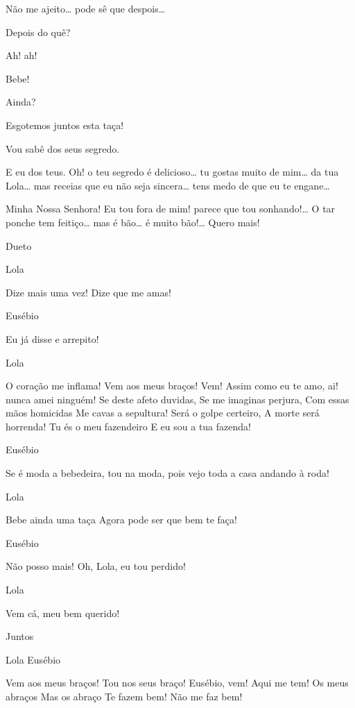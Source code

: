  Não me ajeito\ldots{} pode sê que despois\ldots{}

 Depois do quê?

  Ah! ah!

  Bebe!

 Ainda?

 Esgotemos juntos esta taça! 

 Vou sabê dos seus segredo. 

 E eu dos teus.  Oh! o teu segredo é delicioso\ldots{} tu gostas
muito de mim\ldots{} da tua Lola\ldots{} mas receias que eu não seja sincera\ldots{} tens medo de
que eu te engane\ldots{}

  Minha Nossa Senhora! Eu tou
fora de mim! parece que tou sonhando!\ldots{} O tar ponche tem feitiço\ldots{} mas é
bão\ldots{} é muito bão!\ldots{} Quero mais!

 Dueto

 Lola

 Dize mais uma vez! Dize que me amas!

 Eusébio

 Eu já disse e arrepito!

 Lola

 O coração me inflama!
 Vem aos meus braços! Vem!
 Assim como eu te amo, ai! nunca amei ninguém!
 Se deste afeto duvidas,
 Se me imaginas perjura,
 Com essas mãos homicidas
 Me cavas a sepultura!
 Será o golpe certeiro,
 A morte será horrenda!
 Tu és o meu fazendeiro
 E eu sou a tua fazenda!

 Eusébio

 Se é moda a bebedeira, tou na moda, pois vejo toda a casa andando à roda!

 Lola

 Bebe ainda uma taça
 Agora pode ser que bem te faça!
 
 Eusébio
 
 Não posso mais! 
 Oh, Lola, eu tou perdido!

 Lola

 Vem cá, meu bem querido!

 Juntos

 Lola Eusébio

 Vem aos meus braços! Tou nos seus braço!
 Eusébio, vem! Aqui me tem!
 Os meus abraços Mas os abraço
 Te fazem bem! Não me faz bem!

